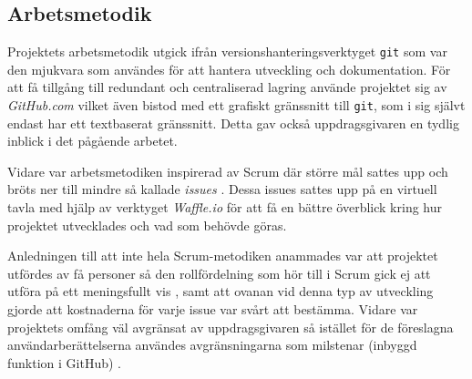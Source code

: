 
    \newpage

    \subsection{Arbetsmetodik} %
    \label{sub:arbetsmetodik}
        Projektets arbetsmetodik utgick ifrån versionshanteringsverktyget \texttt{git} 
        som var den mjukvara som användes för att hantera utveckling och dokumentation. För att få tillgång 
        till redundant och centraliserad lagring använde projektet sig av \textit{GitHub.com} vilket även bistod med ett grafiskt gränssnitt till \texttt{git}, som i sig självt endast har ett textbaserat gränssnitt. Detta gav också uppdragsgivaren en tydlig inblick i det pågående arbetet. \bigskip

        Vidare var arbetsmetodiken inspirerad av Scrum där större mål sattes upp och bröts ner till mindre så kallade \textit{issues} \cite[kap.~8]{scrum}. Dessa issues sattes upp på en virtuell tavla med hjälp av verktyget \textit{Waffle.io} för att få en bättre överblick kring hur projektet utvecklades och vad som behövde göras. \bigskip

        Anledningen till att inte hela Scrum-metodiken anammades var att projektet utfördes av få personer så den rollfördelning som hör till i Scrum gick ej att utföra på ett meningsfullt vis \cite[kap.~6]{scrum}, samt att ovanan vid denna typ av utveckling gjorde att kostnaderna för varje issue var svårt att bestämma. Vidare var projektets omfång väl avgränsat av uppdrags\-givaren så istället för de föreslagna användarberättelserna användes avgränsningarna som milstenar (inbyggd funktion i GitHub) \cite[kap.~9]{scrum}.

